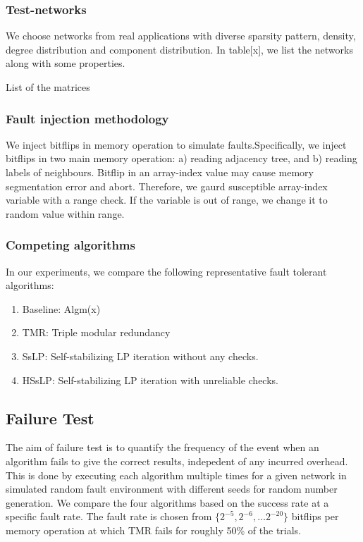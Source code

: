 \subsubsection{Test-networks}

We choose networks from real applications with diverse sparsity pattern,
density, degree distribution and component distribution. In table{[}x{]},
we list the networks along with some properties.

\begin{table}
\caption{List of the matrices}


\end{table}


\subsubsection{Fault injection methodology}

We inject bitflips in memory operation to simulate faults.Specifically,
we inject bitflips in two main memory operation: a) reading adjacency
tree, and b) reading labels of neighbours. Bitflip in an array-index
value may cause memory segmentation error and abort. Therefore, we
gaurd susceptible array-index variable with a range check. If the
variable is out of range, we change it to random value within range.

\subsubsection{Competing algorithms}

In our experiments, we compare the following representative fault
tolerant algorithms:
\begin{enumerate}
\item Baseline: Algm(x) 
\item TMR: Triple modular redundancy 
\item SsLP: Self-stabilizing LP iteration without any checks. 
\item HSsLP: Self-stabilizing LP iteration with unreliable checks. 
\end{enumerate}
%

\subsection{Failure Test}

The aim of failure test is to quantify the frequency of the event
when an algorithm fails to give the correct results, indepedent of
any incurred overhead. This is done by executing each algorithm multiple
times for a given network in simulated random fault environment with
different seeds for random number generation. We compare the four
algorithms based on the success rate at a specific fault rate. The
fault rate is chosen from $\{2^{-5},2^{-6},\ldots2^{-20}\}$ bitflips
per memory operation at which TMR fails for roughly 50\% of the trials. 


